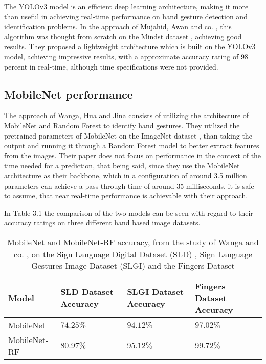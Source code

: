 \par The YOLOv3 model is an efficient deep learning architecture, making it more than useful in achieving real-time performance on hand gesture detection and identification problems. In the approach of Mujahid, Awan and co. \cite{app11094164}, this algorithm was thought from scratch on the Mindst dataset \cite{deng2012mnist}, achieving good results. They proposed a lightweight architecture which is built on the YOLOv3 model, achieving impressive results, with a approximate accuracy rating of 98 percent in real-time, although time specifications were not provided.

\subsection{MobileNet performance}
\label{subsec:preformancesec1subsec2}

\par The approach of Wanga, Hua and Jina \cite{wang2021} consists of utilizing the architecture of MobileNet and Random Forest to identify hand gestures. They utilized the pretrained parameters of MobileNet on the ImageNet dataset \cite{deng2009imagenet}, than taking the output and running it through a Random Forest model to better extract features from the images. Their paper does not focus on performance in the context of the time needed for a prediction, that being said, since they use the MobileNet architecture as their backbone, which in a configuration of around 3.5 million parameters can achieve a pass-through time of around 35 milliseconds, it is safe to assume, that near real-time performance is achievable with their approach.
\par In Table 3.1 the comparison of the two models can be seen with regard to their accuracy ratings on three different hand based image datasets.

\begin{table}[htbp]
\begin{center}
\begin{tabular}
{|p{90pt}|p{90pt}|p{90pt}|p{90pt}|}
\hline
Model & SLD Dataset Accuracy & SLGI Dataset Accuracy & Fingers Dataset Accuracy\\
\hline 
\hline MobileNet & $74.25\%$ & $94.12\%$ & $97.02\%$\\
\hline MobileNet-RF & $80.97\%$ & $95.12\%$ & $99.72\%$\\
\hline
\end{tabular}
\end{center}
\caption{MobileNet and MobileNet-RF accuracy, from the study of Wanga and co. \cite{wang2021}, on the Sign Language Digital Dataset (SLD) \cite{kopf:22025:sign-lang:lrec}, Sign Language Gestures Image Dataset (SLGI) \cite{jimaging9120262} and the Fingers Dataset}
\label{MobileNetTable}
\end{table}

